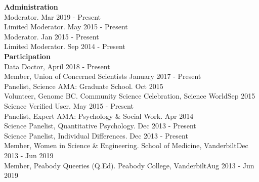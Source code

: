 {\large \textbf{Administration}}\\
Moderator. \href{http://www.reddit.com/r/AcademicPsychology}{\color{blue}{AcademicPsychology, Reddit.com}}\hfill{Mar 2019 - Present}\smallskip\\
Limited Moderator. \href{http://www.reddit.com/r/Science}{\color{blue}{Science, Reddit.com}}\hfill{May 2015 - Present}\smallskip\\
Moderator. \href{http://www.reddit.com/r/GradAdmissions}{\color{blue}{GradAdmissions, Reddit.com}}\hfill{Jan 2015 - Present}\smallskip\\
Limited Moderator. \href{http://www.reddit.com/r/AskScience}{\color{blue}{AskScience, Reddit.com}}\hfill{Sep 2014 - Present}\medskip\\
%
%
{\large \textbf{Participation}}\\
Data Doctor, \href{https://www.wikitree.com}{\color{blue}{WikiTree}} \hfill{April 2018 - Present}\smallskip\\
Member, Union of Concerned Scientists \hfill{January 2017 - Present}\smallskip\\
Panelist, Science AMA: Graduate School. \href{http://www.reddit.com/r/AskScience}{\color{blue}{AskScience, Reddit.com}}\hfill{Oct 2015}\smallskip\\
Volunteer, Genome BC. Community Science Celebration, Science World\hfill{Sep 2015}\smallskip\\
Science Verified User. \href{http://www.reddit.com/r/science}{\color{blue}{Science, Reddit.com}}\hfill{May 2015 - Present}\smallskip\\
Panelist, Expert AMA: Psychology \& Social Work. \href{http://www.reddit.com/r/AskSocialScience}{\color{blue}{AskSocialScience, Reddit.com}}\hfill{Apr 2014}\smallskip\\
Science Panelist, Quantitative Psychology. \href{http://www.reddit.com/r/AskScience}{\color{blue}{AskScience, Reddit.com}}\hfill{Dec 2013 - Present}\smallskip\\%
Science Panelist, Individual Differences. \href{http://www.reddit.com/r/AskSocialScience}{\color{blue}{AskSocialScience, Reddit.com}}\hfill{Dec 2013 - Present}\smallskip\\
Member, Women in Science \& Engineering. School of Medicine, Vanderbilt\hfill{Dec 2013 - Jun 2019}\smallskip\\
Member, Peabody Queeries (Q.Ed). Peabody College, Vanderbilt\hfill{Aug 2013 - Jun 2019}%
%
%
